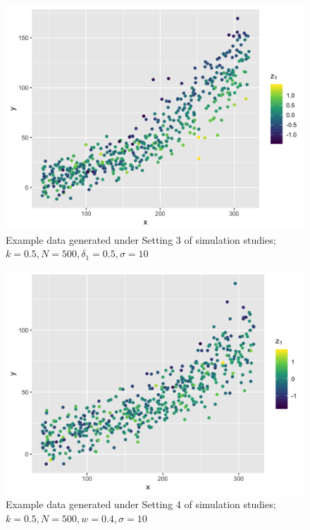 \documentclass [12pt, proquest] {uwthesis}[2016/11/22]
\begin{document}
\begin{figure}
    \centering
    \includegraphics[width = 6 in]{PlotA_3.png}
    \caption{Example data generated under Setting 3 of simulation studies; $k = 0.5, N = 500, \delta_1 = 0.5, \sigma = 10$}
\end{figure}

\begin{figure}
    \centering
    \includegraphics[width = 6 in]{PlotA_4.png}
    \caption{Example data generated under Setting 4 of simulation studies; $k = 0.5, N = 500, w = 0.4, \sigma = 10$}
\end{figure}
\end{document}
